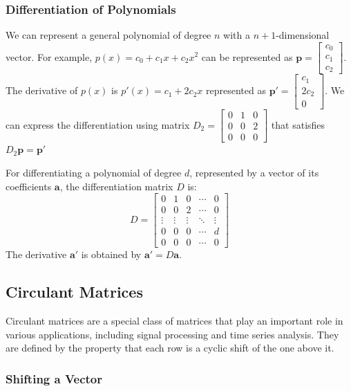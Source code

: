\subsubsection*{Differentiation of Polynomials}
We can represent a general polynomial of degree $n$ with a $n+1$-dimensional vector. For example, $p(x) = c_0 + c_1x + c_2x^2$ can be represented as $\mathbf{p} = \begin{bmatrix}
    c_0\\c_1\\c_2
\end{bmatrix}$. The derivative of $p(x)$ is $p'(x) = c_1 + 2c_2x$ represented as  $\mathbf{p'} = \begin{bmatrix}
    c_1\\2c_2\\0
\end{bmatrix}.$ We can express the differentiation using matrix $D_2 = \begin{bmatrix}
    0&1&0\\0&0&2\\0&0&0
\end{bmatrix}$ that satisfies $D_2 \mathbf{p}=\mathbf{p'}$

For differentiating a polynomial of degree \( d \), represented by a vector of its coefficients \( \mathbf{a} \), the differentiation matrix \( D \) is:
\[ D = \begin{bmatrix}
0 & 1 & 0 & \cdots & 0 \\
0 & 0 & 2 & \cdots & 0 \\
\vdots & \vdots & \vdots & \ddots & \vdots \\
0 & 0 & 0 & \cdots & d \\
0 & 0 & 0 & \cdots & 0
\end{bmatrix} \]
The derivative \( \mathbf{a}' \) is obtained by \( \mathbf{a}' = D\mathbf{a} \).

\subsection{Circulant Matrices}

Circulant matrices are a special class of matrices that play an important role in various applications, including signal processing and time series analysis. They are defined by the property that each row is a cyclic shift of the one above it.
\subsubsection*{Shifting a Vector}

